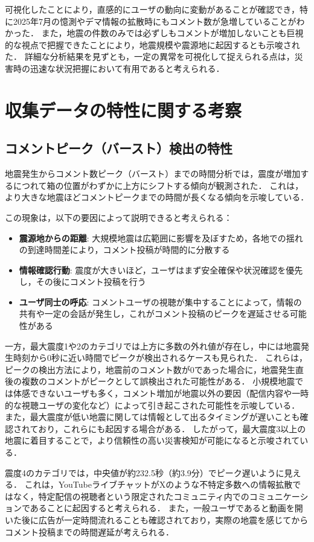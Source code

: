 可視化したことにより，直感的にユーザの動向に変動があることが確認でき，特に2025年7月の憶測やデマ情報の拡散時にもコメント数が急増していることがわかった．
また，地震の件数のみでは必ずしもコメントが増加しないことも巨視的な視点で把握できたことにより，地震規模や震源地に起因するとも示唆された．
詳細な分析結果を見ずとも，一定の異常を可視化して捉えられる点は，災害時の迅速な状況把握において有用であると考えられる．
\section{収集データの特性に関する考察}

\subsection{コメントピーク（バースト）検出の特性}

地震発生からコメント数ピーク（バースト）までの時間分析では，震度が増加するにつれて箱の位置がわずかに上方にシフトする傾向が観測された．
これは，より大きな地震ほどコメントピークまでの時間が長くなる傾向を示唆している．

この現象は，以下の要因によって説明できると考えられる：
\begin{itemize}
    \item \textbf{震源地からの距離}: 大規模地震は広範囲に影響を及ぼすため，各地での揺れの到達時間差により，コメント投稿が時間的に分散する
    \item \textbf{情報確認行動}: 震度が大きいほど，ユーザはまず安全確保や状況確認を優先し，その後にコメント投稿を行う
    \item \textbf{ユーザ同士の呼応}: コメントユーザの視聴が集中することによって，情報の共有や一定の会話が発生し，これがコメント投稿のピークを遅延させる可能性がある
\end{itemize}

一方，最大震度1や2のカテゴリでは上方に多数の外れ値が存在し，中には地震発生時刻から0秒に近い時間でピークが検出されるケースも見られた．
これらは，ピークの検出方法により，地震前のコメント数が0であった場合に，地震発生直後の複数のコメントがピークとして誤検出された可能性がある．
小規模地震では体感できないユーザも多く，コメント増加が地震以外の要因（配信内容や一時的な視聴ユーザの変化など）によって引き起こされた可能性を示唆している．
また，最大震度が低い地震に関しては情報として出るタイミングが遅いことも確認されており，これらにも起因する場合がある．
したがって，最大震度3以上の地震に着目することで，より信頼性の高い災害検知が可能になると示唆されている．

震度4のカテゴリでは，中央値が約232.5秒（約3.9分）でピーク遅いように見える．
これは，YouTubeライブチャットがXのような不特定多数への情報拡散ではなく，特定配信の視聴者という限定されたコミュニティ内でのコミュニケーションであることに起因すると考えられる．
また，一般ユーザであると動画を開いた後に広告が一定時間流れることも確認されており，実際の地震を感じてからコメント投稿までの時間遅延が考えられる．

